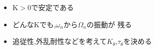 \documentclass[class=article, crop=false, dvipdfmx]{standalone}
\begin{document}


\begin{itemize}
\item K$>$0で安定である
\item どんなKでも,$\omega_n$から$\Omega_n$の振動が
残る
\item 追従性,外乱耐性などを考えて$K_\theta$,$\tau_\theta$を決める
\end{itemize}


%

%

%

\end{document}
